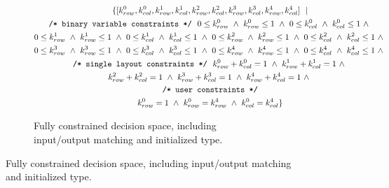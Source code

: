 \begin{figure}
\begin{subfigure}{\columnwidth}
\begin{gather*}
	\{ [k_{row}^{0}, k_{col}^{0}, k_{row}^{1}, k_{col}^{1},k_{row}^{2}, k_{col}^{2},k_{row}^{3}, k_{col}^{3},k_{row}^{4}, k_{col}^{4}] \ \ \vert \\
	\text{\texttt{/* binary variable constraints */}} \ \ 
	0 \leq k_{row}^0 \ \land \ k_{row}^0 \leq 1 \ \land \
	0 \leq k_{col}^0 \ \land \ k_{col}^0 \leq 1 \ \land \ \\
	0 \leq k_{row}^1 \ \land \ k_{row}^1 \leq 1 \ \land \
	0 \leq k_{col}^1 \ \land \ k_{col}^1 \leq 1 \ \land \ 
	0 \leq k_{row}^2 \ \land \ k_{row}^2 \leq 1 \ \land \ 
	0 \leq k_{col}^2 \ \land \ k_{col}^2 \leq 1 \ \land \ \\
	0 \leq k_{row}^3 \ \land \ k_{row}^3 \leq 1 \ \land \
	0 \leq k_{col}^3 \ \land \ k_{col}^3 \leq 1 \ \land \ 
	0 \leq k_{row}^4 \ \land \ k_{row}^4 \leq 1 \ \land \
	0 \leq k_{col}^4 \ \land \ k_{col}^4 \leq 1 \ \land \ \\
	\text{\texttt{/* single layout constraints */}} \ \ 
	k_{row}^0 + k_{col}^0 = 1 \ \land \ 
	k_{row}^1 + k_{col}^1 = 1 \ \land \ \\
	k_{row}^2 + k_{col}^2 = 1 \ \land \
	k_{row}^3 + k_{col}^3 = 1 \ \land \
	k_{row}^4 + k_{col}^4 = 1 \ \land \ \\
	\text{\texttt{/* user constraints */}} \\
	k_{row}^0 = 1 \ \land \ k_{row}^0 = k_{row}^4 \ \land \ k_{col}^0 = k_{col}^4
	\}
\end{gather*}
	\caption{Fully constrained decision space, including input/output matching and initialized type.}
\end{subfigure}


\end{figure}
